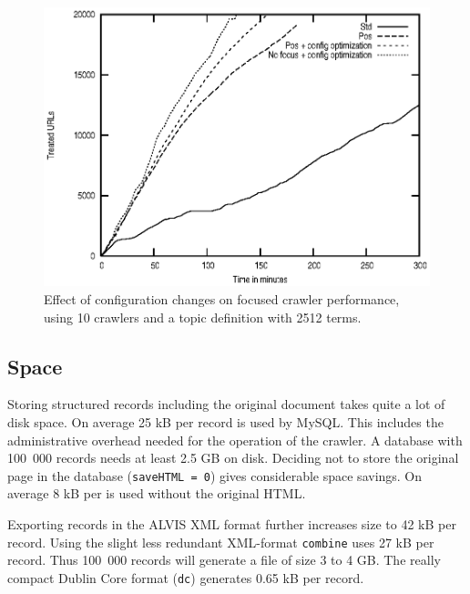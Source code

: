 \begin{figure}[htb]
\begin{center}
 \includegraphics[height=0.4\textheight]{Config.ps}
\end{center}
\caption{Effect of configuration changes on focused crawler performance, using 10 crawlers and a topic definition with 2512 terms.}
\label{config}
\end{figure}

\subsection{Space}

Storing structured records including the original document takes
quite a lot of disk space. On average 25 kB per record is
used by MySQL. This includes the administrative overhead needed
for the operation of the crawler. A database with 100~000 records
needs at least 2.5 GB on disk. Deciding not to store the original
page in the database ({\tt saveHTML = 0}) gives considerable space
savings. On average 8 kB per is used without the original HTML.

%
%
%
%

Exporting records in the ALVIS XML format further increases size
to 42 kB per record. Using the slight less redundant XML-format
{\tt combine} uses 27 kB per record. Thus 100~000 records will generate
a file of size 3 to 4 GB. The really compact Dublin Core format ({\tt dc}) generates 0.65 kB per record.

